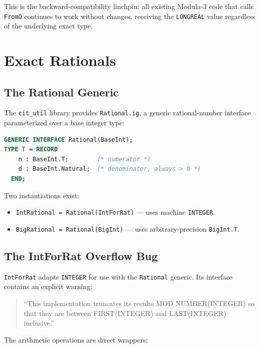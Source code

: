 \documentclass[12pt]{report}
\begin{document}
\noindent This is the backward-compatibility linchpin: all existing
Modula-3 code that calls {\tt FromO} continues to work without
changes, receiving the {\tt LONGREAL} value regardless of the
underlying exact type.

\section{Exact Rationals}

\subsection{The Rational Generic}

The {\tt cit\_util} library provides {\tt Rational.ig}, a generic
rational-number interface parameterized over a base integer type:

\begin{lstlisting}[language=Modula3]
GENERIC INTERFACE Rational(BaseInt);
TYPE T = RECORD
    n : BaseInt.T;        (* numerator *)
    d : BaseInt.Natural;  (* denominator, always > 0 *)
  END;
\end{lstlisting}

\noindent Two instantiations exist:
\begin{itemize}
\item {\tt IntRational = Rational(IntForRat)} --- uses machine
  {\tt INTEGER}.
\item {\tt BigRational = Rational(BigInt)} --- uses arbitrary-precision
  {\tt BigInt.T}.
\end{itemize}

\subsection{The IntForRat Overflow Bug}
\label{sec:intforrat-bug}

{\tt IntForRat} adapts {\tt INTEGER} for use with the {\tt Rational}
generic.  Its interface contains an explicit warning:

\begin{quote}
  ``This implementation truncates its results MOD NUMBER(INTEGER) so
  that they are between FIRST(INTEGER) and LAST(INTEGER) inclusive.''
\end{quote}

\noindent The arithmetic operations are direct wrappers:
\end{document}
